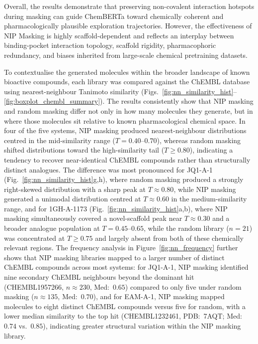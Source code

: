 \documentclass[a4paper,12pt]{article}
\begin{document}
Overall, the results demonstrate that preserving non-covalent interaction hotspots during masking can guide ChemBERTa toward chemically coherent and pharmacologically plausible exploration trajectories. However, the effectiveness of NIP Masking  is highly scaffold-dependent and reflects an interplay between binding-pocket interaction topology, scaffold rigidity, pharmacophoric redundancy, and biases inherited from large-scale chemical pretraining datasets.

To contextualise the generated molecules within the broader landscape
of known bioactive compounds, each library was compared against the
ChEMBL database using nearest-neighbour Tanimoto similarity
(Figs.~\ref{fig:nn_similarity_hist}--\ref{fig:boxplot_chembl_summary}).
The results consistently show that NIP masking and random masking differ
not only in how many molecules they generate, but in where those molecules
sit relative to known pharmacological chemical space.
In four of the five systems, NIP masking produced nearest-neighbour
distributions centred in the mid-similarity range ($T = 0.40$--$0.70$),
whereas random masking shifted distributions toward the high-similarity
tail ($T \geq 0.80$), indicating a tendency to recover near-identical
ChEMBL compounds rather than structurally distinct analogues.
The difference was most pronounced for JQ1-A-1
(Fig.~\ref{fig:nn_similarity_hist}g,h), where random masking
produced a strongly right-skewed distribution with a sharp peak
at $T \approx 0.80$, while NIP masking generated a unimodal
distribution centred at $T \approx 0.60$ in the medium-similarity
range, and for 1GH-A-1173 (Fig.~\ref{fig:nn_similarity_hist}a,b),
where NIP masking simultaneously covered a novel-scaffold peak near
$T \approx 0.30$ and a broader analogue population at
$T = 0.45$--$0.65$, while the random library ($n = 21$) was
concentrated at $T \geq 0.75$ and largely absent from both of
these chemically relevant regions.
The frequency analysis in Figure~\ref{fig:nn_frequency} further shows
that NIP masking libraries mapped to a larger number of distinct ChEMBL
compounds across most systems: for JQ1-A-1, NIP masking identified
nine secondary ChEMBL neighbours beyond the dominant hit
(CHEMBL1957266, $n \approx 230$, Med:~$0.65$) compared to only five
under random masking ($n \approx 135$, Med:~$0.70$), and for EAM-A-1,
NIP masking mapped molecules to eight distinct ChEMBL compounds versus
five for random, with a lower median similarity to the top hit
(CHEMBL1232461, PDB:~7AQT; Med:~$0.74$ vs.\ $0.85$), indicating
greater structural variation within the NIP masking library.
\end{document}

